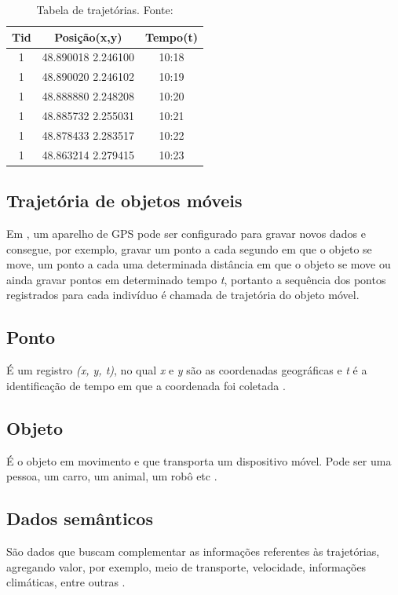 \documentclass[	12pt, Times, openright, twoside, a4paper, english, brazil]{abntex2}
\begin{document}
\begin{table}[!ht]
	\centering
		\caption{Tabela de trajetórias. Fonte:\cite{Bogorny2012}}	\label{tab:exemplo}
		\begin{tabular}{|c|c|c|}
			\hline  \textbf{Tid} &	\textbf{Posição(x,y)} &	\textbf{Tempo(t)} \\
			\hline 1 & 48.890018	2.246100	& 10:18	\\
			\hline 1 & 48.890020	2.246102	& 10:19	\\
			\hline 1 & 48.888880	2.248208	& 10:20	\\
			\hline 1 & 48.885732	2.255031	& 10:21	\\
			\hline 1 & 48.878433	2.283517	& 10:22	\\
            \hline 1 & 48.863214	2.279415	& 10:23	\\
			\hline 
		\end{tabular}
\end{table}

\subsection{Trajetória de objetos móveis}
Em \cite{Bogorny2012}, um aparelho de GPS pode ser configurado para gravar novos dados e consegue, por exemplo, gravar um ponto a cada segundo em que o objeto se move, um ponto a cada uma determinada distância em que o objeto se move ou ainda gravar pontos em determinado tempo \textit{t}, portanto a sequência dos pontos registrados para cada indivíduo é chamada de trajetória do objeto móvel.

\subsection{Ponto}
É um registro \textit{(x, y, t)}, no qual \textit{x} e \textit{y} são as coordenadas geográficas e \textit{t} é a identificação de tempo em que a coordenada foi coletada \cite{Bogorny2014}.

\subsection{Objeto}
É o objeto em movimento e que transporta um dispositivo móvel. Pode
ser uma pessoa, um carro, um animal, um robô etc \cite{Bogorny2014}.

\subsection{Dados semânticos}
São dados que buscam complementar as informações referentes às trajetórias, agregando valor, por exemplo, meio de transporte, velocidade, informações climáticas, entre outras \cite{Bogorny2014}.
\end{document}
